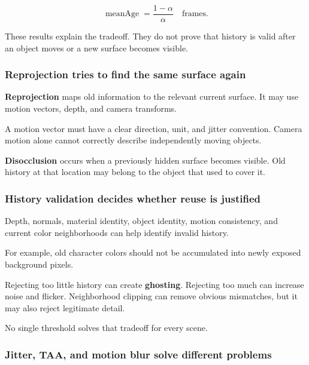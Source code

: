\[
\operatorname{meanAge}=\frac{1-\alpha}{\alpha}
\quad\text{frames}.
\]

These results explain the tradeoff. They do not prove that history is valid after an object moves or a new surface becomes visible.

\subsubsection{Reprojection tries to find the same surface again}\label{04-visual-computing-ii-ch042-reprojection-tries-to-find-the-same-surface-again}

\hypertarget{04-visual-computing-ii-ch042-reprojection-tries-to-find-the-same-surface-again}{}

\textbf{Reprojection} maps old information to the relevant current surface. It may use motion vectors, depth, and camera transforms.

A motion vector must have a clear direction, unit, and jitter convention. Camera motion alone cannot correctly describe independently moving objects.

\textbf{Disocclusion} occurs when a previously hidden surface becomes visible. Old history at that location may belong to the object that used to cover it.

\subsubsection{History validation decides whether reuse is justified}\label{04-visual-computing-ii-ch042-history-validation-decides-whether-reuse-is-justified}

\hypertarget{04-visual-computing-ii-ch042-history-validation-decides-whether-reuse-is-justified}{}

Depth, normals, material identity, object identity, motion consistency, and current color neighborhoods can help identify invalid history.

For example, old character colors should not be accumulated into newly exposed background pixels.

Rejecting too little history can create \textbf{ghosting}. Rejecting too much can increase noise and flicker. Neighborhood clipping can remove obvious mismatches, but it may also reject legitimate detail.

No single threshold solves that tradeoff for every scene.

\subsubsection{Jitter, TAA, and motion blur solve different problems}\label{04-visual-computing-ii-ch042-jitter-taa-and-motion-blur-solve-different-problems}

